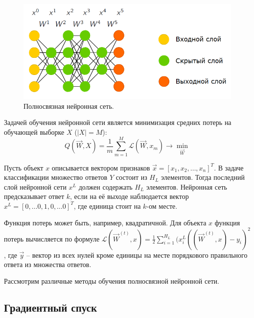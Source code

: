\begin{figure}[h]
	\centering
	\includegraphics[width=0.6\linewidth]{chapters/neural/images/full_net.png}
	\caption{Полносвязная нейронная сеть.}
	\label{img:full_net}
\end{figure}

Задачей обучения нейронной сети является минимизация средних потерь на обучающей выборке $X$ ($|X| = M$):
$$
Q(\overrightarrow{W}, X) = \frac{1}{m} \sum\limits_{m = 1}^{M} \mathcal{L} (\overrightarrow{W}, x_m) \rightarrow \min_{\overrightarrow{W}}
$$

Пусть объект $x$ описывается вектором признаков $\overrightarrow{x} = [x_1, x_2, \dots, x_n]^T$. В задаче классификации множество ответов $Y$ состоит из $H_L$ элементов. Тогда последний слой нейронной сети $x^{L}$ должен содержать $H_L$ элементов. Нейронная сеть предсказывает ответ $k$, если на её выходе наблюдается вектор $x^L = [0, \dots 0, 1, 0, \dots 0]^T$, где единица стоит на $k$-ом месте. 

Функция потерь может быть, например, квадратичной. Для объекта $x$ функция потерь вычисляется по формуле $\mathcal{L} (\overrightarrow{W}^{(t)}, x) = \frac{1}{2} \sum\limits_{i = 1}^{H_L} (x^L_i ((\overrightarrow{W}^{(t)}, x) - y_i)^2$, где $\overrightarrow{y}$ -- вектор из всех нулей кроме единицы на месте порядкового правильного ответа из множества ответов.

Рассмотрим различные методы обучения полносвязной нейронной сети.

\subsection{Градиентный спуск}

